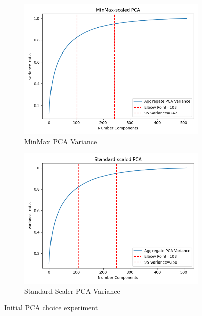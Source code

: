 \documentclass[12pt]{article}
\begin{document}
\begin{figure}
    \begin{subfigure}{.5\textwidth}
        \includegraphics[width=.95\textwidth]{../../results_Experiment1/MinMax_PCA_choice.png}
        \caption{MinMax PCA Variance}
        \end{subfigure}%
      \begin{subfigure}{.5\textwidth}
        \includegraphics[width=.95\textwidth]{../../results_Experiment1/Standard_PCA_choice.png}
        \caption{Standard Scaler PCA Variance}
      \end{subfigure}
      \caption{Initial PCA choice experiment}
      \label{figure1}
\end{figure}
\end{document}
